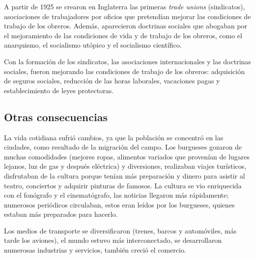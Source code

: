 \documentclass{article}
\begin{document}
{  A partir de 1925 se crearon en Inglaterra las primeras \textit{trade unions} (sindicatos), asociaciones de trabajadores por oficios que pretendían mejorar las condiciones de trabajo de los obreros. Además, aparecieron doctrinas sociales que abogaban por el mejoramiento de las condiciones de vida y de trabajo de los obreros, como el anarquismo, el socialismo utópico y el socialismo científico.

  Con la formación de los sindicatos, las asociaciones internacionales y las doctrinas sociales, fueron mejorando las condiciones de trabajo de los obreros: adquisición de seguros sociales, reducción de las horas laborales, vacaciones pagas y establecimiento de leyes protectoras.

  \subsection*{Otras consecuencias}
  La vida cotidiana sufrió cambios, ya que la población se concentró en las ciudades, como resultado de la migración del campo. Los burgueses gozaron de muchas comodidades (mejores ropas, alimentos variados que provenían de lugares lejanos, luz de gas y después eléctrica) y diversiones, realizaban viajes turísticos, disfrutaban de la cultura porque tenían más preparación y dinero para asistir al teatro, conciertos y adquirir pinturas de famosos. La cultura se vio enriquecida con el fonógrafo y el cinematógrafo, las noticias llegaron más rápidamente; numerosos periódicos circulaban, estos eran leídos por los burgueses, quienes estaban más preparados para hacerlo.

  Los medios de transporte se diversificaron (trenes, barcos y automóviles, más tarde los aviones), el mundo estuvo más interconectado, se desarrollaron numerosas industrias y servicios, también creció el comercio.

}
\end{document}
